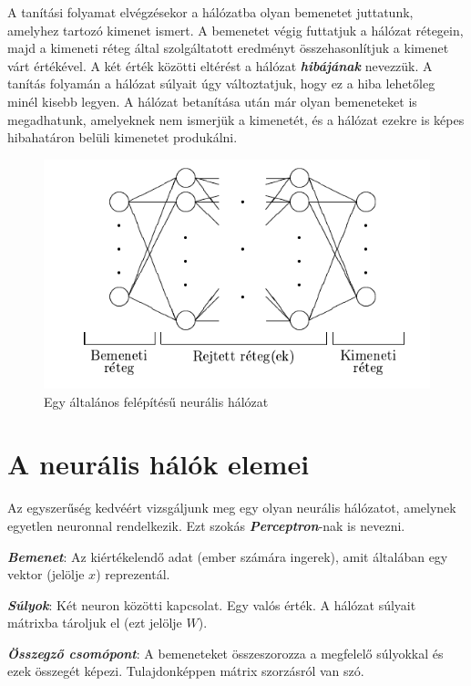 A tanítási folyamat elvégzésekor a hálózatba olyan bemenetet juttatunk, amelyhez tartozó kimenet ismert. A bemenetet végig futtatjuk a hálózat rétegein, majd a kimeneti réteg által szolgáltatott eredményt összehasonlítjuk a kimenet várt értékével. A két érték közötti eltérést a hálózat \textit{\textbf{hibájának}} nevezzük. A tanítás folyamán a hálózat súlyait úgy változtatjuk, hogy ez a hiba lehetőleg minél kisebb legyen. A hálózat betanítása után már olyan bemeneteket is megadhatunk, amelyeknek nem ismerjük a kimenetét, és a hálózat ezekre is képes hibahatáron belüli kimenetet produkálni.

\begin{figure}[h]
	\centering
	\includegraphics[scale=0.75]{images/ANNLayers.png}
	\caption{Egy általános felépítésű neurális hálózat}
\end{figure}

\section{A neurális hálók elemei}

Az egyszerűség kedvéért vizsgáljunk meg egy olyan neurális hálózatot, amelynek egyetlen neuronnal rendelkezik. Ezt szokás \textbf{\textit{Perceptron}}-nak is nevezni.

\textbf{\textit{Bemenet}}: Az kiértékelendő adat (ember számára ingerek), amit általában egy vektor (jelölje $x$) reprezentál.

\textit{\textbf{Súlyok}}: Két neuron közötti kapcsolat. Egy valós érték. A hálózat súlyait mátrixba tároljuk el (ezt jelölje $W$).

\textbf{\textit{Összegző csomópont}}: A bemeneteket összeszorozza a megfelelő súlyokkal és ezek összegét képezi. Tulajdonképpen mátrix szorzásról van szó.


